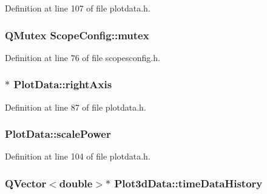 Definition at line 107 of file plotdata.\-h.

\hypertarget{group___scope_plugin_ga482a0dd2b656ddf480def36bacca8aac}{
\subsubsection[{mutex}]{\setlength{\rightskip}{0pt plus 5cm}Q\-Mutex Scope\-Config\-::mutex\hspace{0.3cm}{\ttfamily [protected]}}}\label{group___scope_plugin_ga482a0dd2b656ddf480def36bacca8aac}


Definition at line 76 of file scopesconfig.\-h.

\hypertarget{group___scope_plugin_gad0b4661f32046ccf0ab49100be76c1b3}{
\subsubsection[{right\-Axis}]{$\ast$ Plot\-Data\-::right\-Axis}}\label{group___scope_plugin_gad0b4661f32046ccf0ab49100be76c1b3}


Definition at line 87 of file plotdata.\-h.

\hypertarget{group___scope_plugin_gad4b115ab449c4276ef15d3e2862e6280}{
\subsubsection[{scale\-Power}]{ Plot\-Data\-::scale\-Power\hspace{0.3cm}{\ttfamily [protected]}}}\label{group___scope_plugin_gad4b115ab449c4276ef15d3e2862e6280}


Definition at line 104 of file plotdata.\-h.

\hypertarget{group___scope_plugin_ga92914eba20188371aeb3ad365c01acc4}{
\subsubsection[{time\-Data\-History}]{\setlength{\rightskip}{0pt plus 5cm}Q\-Vector$<${\bf double}$>$$\ast$ Plot3d\-Data\-::time\-Data\-History}}\label{group___scope_plugin_ga92914eba20188371aeb3ad365c01acc4}


